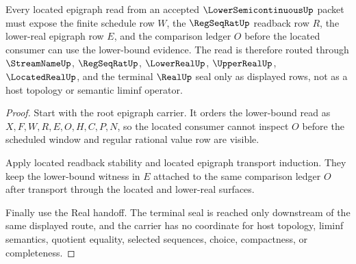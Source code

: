 \begin{theorem}
\label{thm:lower-semicontinuous-located-epigraph-route}
Every located epigraph read from an accepted $\LowerSemicontinuousUp$ packet must expose the finite schedule row $W$, the $\RegSeqRatUp$ readback row $R$, the lower-real epigraph row $E$, and the comparison ledger $O$ before the located consumer can use the lower-bound evidence. The read is therefore routed through $\StreamNameUp$, $\RegSeqRatUp$, $\LowerRealUp$, $\UpperRealUp$, $\LocatedRealUp$, and the terminal $\RealUp$ seal only as displayed rows, not as a host topology or semantic liminf operator.
\end{theorem}
\begin{proof}
Start with the root epigraph carrier. It orders the lower-bound read as $X,F,W,R,E,O,H,C,P,N$, so the located consumer cannot inspect $O$ before the scheduled window and regular rational value row are visible.

Apply located readback stability and located epigraph transport induction. They keep the lower-bound witness in $E$ attached to the same comparison ledger $O$ after transport through the located and lower-real surfaces.

Finally use the Real handoff. The terminal seal is reached only downstream of the same displayed route, and the carrier has no coordinate for host topology, liminf semantics, quotient equality, selected sequences, choice, compactness, or completeness.
\end{proof}

